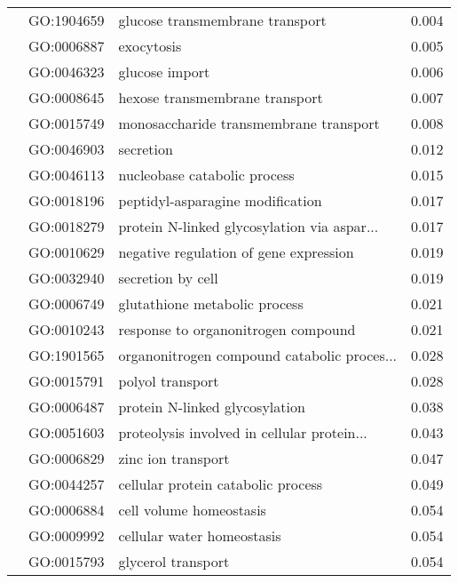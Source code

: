 \begin{longtable}{lllr}
   & GO:1904659 &              glucose transmembrane transport &         0.004 \\
   & GO:0006887 &                                   exocytosis &         0.005 \\
   & GO:0046323 &                               glucose import &         0.006 \\
   & GO:0008645 &               hexose transmembrane transport &         0.007 \\
   & GO:0015749 &       monosaccharide transmembrane transport &         0.008 \\
   & GO:0046903 &                                    secretion &         0.012 \\
   & GO:0046113 &                 nucleobase catabolic process &         0.015 \\
   & GO:0018196 &             peptidyl-asparagine modification &         0.017 \\
   & GO:0018279 &  protein N-linked glycosylation via aspar... &         0.017 \\
   & GO:0010629 &       negative regulation of gene expression &         0.019 \\
   & GO:0032940 &                            secretion by cell &         0.019 \\
   & GO:0006749 &                glutathione metabolic process &         0.021 \\
   & GO:0010243 &          response to organonitrogen compound &         0.021 \\
   & GO:1901565 &  organonitrogen compound catabolic proces... &         0.028 \\
   & GO:0015791 &                             polyol transport &         0.028 \\
   & GO:0006487 &               protein N-linked glycosylation &         0.038 \\
   & GO:0051603 &  proteolysis involved in cellular protein... &         0.043 \\
   & GO:0006829 &                           zinc ion transport &         0.047 \\
   & GO:0044257 &           cellular protein catabolic process &         0.049 \\
   & GO:0006884 &                      cell volume homeostasis &         0.054 \\
   & GO:0009992 &                   cellular water homeostasis &         0.054 \\
   & GO:0015793 &                           glycerol transport &         0.054 \\

\end{longtable}

